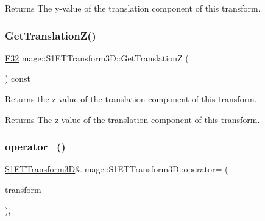 \begin{DoxyReturn}{Returns}
The y-\/value of the translation component of this transform. 
\end{DoxyReturn}
\mbox{\label{classmage_1_1_s1_e_t_transform3_d_a9d56558b29933a1e5d731fcb07e774ac}} 
\subsubsection{\texorpdfstring{Get\+Translation\+Z()}{GetTranslationZ()}}
{\footnotesize\ttfamily \mbox{\hyperlink{namespacemage_aa97e833b45f06d60a0a9c4fc22ae02c0}{F32}} mage\+::\+S1\+E\+T\+Transform3\+D\+::\+Get\+TranslationZ (\begin{DoxyParamCaption}{ }\end{DoxyParamCaption}) const\hspace{0.3cm}{\ttfamily [noexcept]}}

Returns the z-\/value of the translation component of this transform.

\begin{DoxyReturn}{Returns}
The z-\/value of the translation component of this transform. 
\end{DoxyReturn}
\mbox{\label{classmage_1_1_s1_e_t_transform3_d_a71ac2eca4b482b728ba0ad99588a800e}} 
\subsubsection{\texorpdfstring{operator=()}{operator=()}\hspace{0.1cm}{\footnotesize\ttfamily [1/2]}}
{\footnotesize\ttfamily \mbox{\hyperlink{classmage_1_1_s1_e_t_transform3_d}{S1\+E\+T\+Transform3D}}\& mage\+::\+S1\+E\+T\+Transform3\+D\+::operator= (\begin{DoxyParamCaption}\item[{const \mbox{\hyperlink{classmage_1_1_s1_e_t_transform3_d}{S1\+E\+T\+Transform3D}} \&}]{transform }\end{DoxyParamCaption})\hspace{0.3cm}{\ttfamily [default]}, {\ttfamily [noexcept]}}

